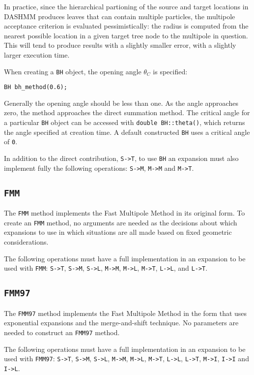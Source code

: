\documentclass[11pt]{book}
\begin{document}
In practice, since the
hierarchical partioning of the source and target locations in DASHMM produces
leaves that can contain multiple particles, the multipole acceptance criterion
is evaluated pessimistically: the radius is computed from the nearest possible
location in a given target tree node to the multipole in question. This will
tend to produce results with a slightly smaller error, with a slightly larger
execution time.

When creating a {\tt BH} object, the opening angle $\theta_C$ is specified:

\begin{verbatim}
BH bh_method(0.6);
\end{verbatim}

Generally the opening angle should be less than one. As the angle approaches
zero, the method approaches the direct summation method. The critical angle
for a particular {\tt BH} object can be accessed with {\tt double BH::theta()},
which returns the angle specified at creation time. A default constructed
{\tt BH} uses a critical angle of {\tt 0}.

In addition to the direct contribution, {\tt S->T}, to use {\tt BH} an expansion
must also implement fully the following operations: {\tt S->M}, {\tt M->M} 
and {\tt M->T}.

\subsection{{\tt FMM}}

The {\tt FMM} method implements the Fast Multipole Method in its original form.
To create an {\tt FMM} method, no arguments are needed as the decisions about
which expansions to use in which situations are all made based on fixed
geometric considerations.

The following operations must have a full implementation in an expansion to be
used with {\tt FMM}: {\tt S->T}, {\tt S->M}, {\tt S->L}, {\tt M->M}, 
{\tt M->L}, {\tt M->T}, {\tt L->L}, and {\tt L->T}.

\subsection{{\tt FMM97}}

The {\tt FMM97} method implements the Fast Multipole Method in the form that
uses exponential expansions and the merge-and-shift technique. No parameters
are needed to construct an {\tt FMM97} method.

The following operations must have a full implementation in an expansion to be
used with {\tt FMM97}: {\tt S->T}, {\tt S->M}, {\tt S->L}, {\tt M->M}, 
{\tt M->L}, {\tt M->T}, {\tt L->L},
{\tt L->T}, {\tt M->I}, {\tt I->I} and {\tt I->L}.
\end{document}
